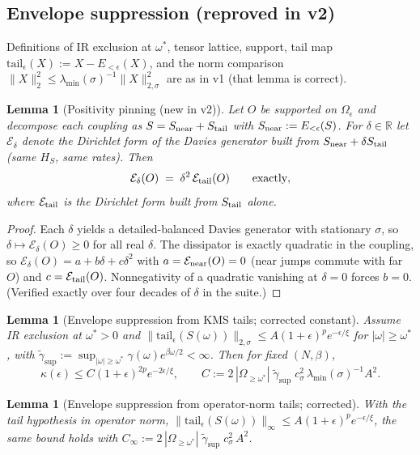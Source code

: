 \documentclass[11pt]{article}
\newtheorem{lemma}[theorem]{Lemma}
\theoremstyle{remark}
\newcommand{\kms}[1]{\|#1\|_{2,\sigma}}
\begin{document}
\subsection{Envelope suppression (reproved in v2)}
Definitions of IR exclusion at $\omega^* $, tensor lattice, support, tail
map $\mathrm{tail}_\epsilon(X) := X - E_{<\epsilon}(X)$, and the norm
comparison $\|X\|_2^2 \le \lambda_{\min}(\sigma)^{-1}\kms{X}^2$ are as in
v1 (that lemma is correct).
\begin{lemma}[Positivity pinning (new in v2)]
\label{lem:pin}
Let $O$ be supported on $\Omega_\epsilon$ and decompose each coupling as
$S = S_{\rm near} + S_{\rm tail}$ with $S_{\rm near} :=
E_{<\epsilon}(S)$. For $\delta \in \mathbb{R}$ let
$\mathcal{E}_\delta$ denote the Dirichlet form of the Davies generator
built from $S_{\rm near} + \delta S_{\rm tail}$ (same $H_S$, same rates).
Then
\[
\mathcal{E}_\delta(O) \;=\; \delta^2\, \mathcal{E}_{\rm tail}(O)
\qquad\text{exactly},
\]
where $\mathcal{E}_{\rm tail}$ is the Dirichlet form built from
$S_{\rm tail}$ alone.
\end{lemma}
\begin{proof}
Each $\delta$ yields a detailed-balanced Davies generator with stationary
$\sigma$, so $\delta \mapsto \mathcal{E}_\delta(O) \ge 0$ for all real
$\delta$. The dissipator is exactly quadratic in the coupling, so
$\mathcal{E}_\delta(O) = a + b\delta + c\delta^2$ with $a =
\mathcal{E}_{\rm near}(O) = 0$ (near jumps commute with far $O$) and $c =
\mathcal{E}_{\rm tail}(O)$. Nonnegativity of a quadratic vanishing at
$\delta = 0$ forces $b = 0$. (Verified exactly over four decades of
$\delta$ in the suite.)
\end{proof}
\begin{lemma}[Envelope suppression from KMS tails; corrected constant]
\label{lem:sup1}
Assume IR exclusion at $\omega^* > 0$ and
$\kms{\mathrm{tail}_\epsilon(S(\omega))} \le A(1+\epsilon)^p
e^{-\epsilon/\xi}$ for $|\omega| \ge \omega^*$, with
$\tilde\gamma_{\sup} := \sup_{|\omega|\ge\omega^*}
\gamma(\omega)e^{\beta\omega/2} < \infty$. Then for fixed $(N, \beta)$,
\[
\kappa(\epsilon) \le C (1+\epsilon)^{2p} e^{-2\epsilon/\xi},
\qquad
C := 2\, |\Omega_{\ge\omega^*}|\; \tilde\gamma_{\sup}\; c_\sigma^2\,
\lambda_{\min}(\sigma)^{-1} A^2 .
\]
\end{lemma}
\begin{lemma}[Envelope suppression from operator-norm tails; corrected]
\label{lem:sup2}
With the tail hypothesis in operator norm,
$\|\mathrm{tail}_\epsilon(S(\omega))\|_\infty \le A(1+\epsilon)^p
e^{-\epsilon/\xi}$, the same bound holds with
$C_\infty := 2\, |\Omega_{\ge\omega^*}|\; \tilde\gamma_{\sup}\;
c_\sigma^2\, A^2$.
\end{lemma}
\end{document}
